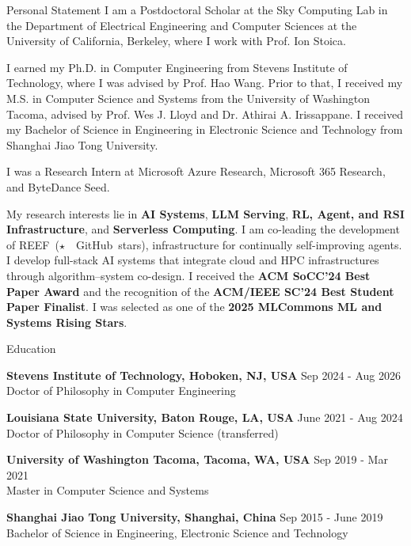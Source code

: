\documentclass{resume} %
\begin{document}

\begin{rSection}{Personal Statement}
I am a Postdoctoral Scholar at the Sky Computing Lab in the Department of Electrical Engineering and Computer Sciences at the University of California, Berkeley, where I work with Prof. Ion Stoica.

I earned my Ph.D. in Computer Engineering from Stevens Institute of Technology, where I was advised by Prof. Hao Wang. Prior to that, I received my M.S. in Computer Science and Systems from the University of Washington Tacoma, advised by Prof. Wes J. Lloyd and Dr. Athirai A. Irissappane. I received my Bachelor of Science in Engineering in Electronic Science and Technology from Shanghai Jiao Tong University.

I was a Research Intern at Microsoft Azure Research, Microsoft 365 Research, and ByteDance Seed.

My research interests lie in \textbf{AI Systems}, \textbf{LLM Serving}, \textbf{RL, Agent, and RSI Infrastructure}, and \textbf{Serverless Computing}.
I am co-leading the development of REEF~\mbox{($\star$~\ReefGitHubStarsCompact\ GitHub stars)}, infrastructure for continually self-improving agents.
I develop full-stack AI systems that integrate cloud and HPC infrastructures through algorithm–system co-design.
I received the \textbf{ACM SoCC’24 Best Paper Award} and the recognition of the \textbf{ACM/IEEE SC’24 Best Student Paper Finalist}.
I was selected as one of the \textbf{2025 MLCommons ML and Systems Rising Stars}.

\end{rSection}


\begin{rSection}{Education}

{\bf Stevens Institute of Technology, Hoboken, NJ, USA} \hfill {Sep 2024 - Aug 2026}
\\ Doctor of Philosophy in Computer Engineering

{\bf Louisiana State University, Baton Rouge, LA, USA} \hfill {June 2021 - Aug 2024}
\\ Doctor of Philosophy in Computer Science (transferred)

{\bf University of Washington Tacoma, Tacoma, WA, USA} \hfill {Sep 2019 - Mar 2021}
\\ Master in Computer Science and Systems

{\bf Shanghai Jiao Tong University, Shanghai, China} \hfill {Sep 2015 - June 2019}
\\ Bachelor of Science in Engineering, Electronic Science and Technology

\end{rSection}
\end{document}
